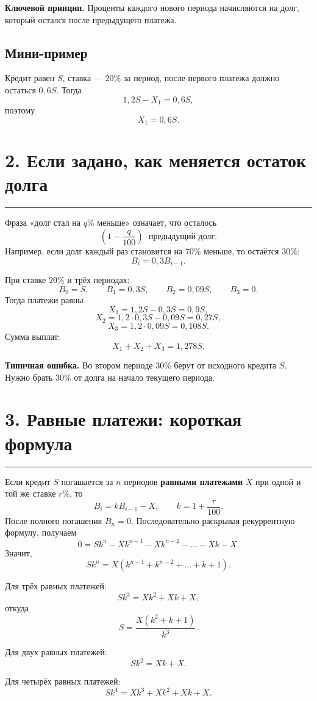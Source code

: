 \documentclass[a4paper,12pt]{article}
\newcommand{\sectionline}{\vspace{-0.4em}\textcolor{linegray}{\rule{\linewidth}{0.5pt}}\vspace{0.35em}}
\newcommand{\key}[1]{\textcolor{darkaccent}{\textbf{#1}}}
\begin{document}
\key{Ключевой принцип.} Проценты каждого нового периода начисляются на долг, который остался после предыдущего платежа.

\subsection*{Мини-пример}
Кредит равен $S$, ставка --- $20\%$ за период, после первого платежа должно остаться $0{,}6S$.
Тогда
\[
1{,}2S-X_1=0{,}6S,
\]
поэтому
\[
\boxed{X_1=0{,}6S.}
\]

\section*{2. Если задано, как меняется остаток долга}
\sectionline

Фраза «долг стал на $q\%$ меньше» означает, что осталось
\[
\left(1-\frac{q}{100}\right)\cdot\text{предыдущий долг}.
\]
Например, если долг каждый раз становится на $70\%$ меньше, то остаётся $30\%$:
\[
B_i=0{,}3B_{i-1}.
\]

При ставке $20\%$ и трёх периодах:
\[
B_0=S,\qquad B_1=0{,}3S,\qquad B_2=0{,}09S,\qquad B_3=0.
\]
Тогда платежи равны
\[
X_1=1{,}2S-0{,}3S=0{,}9S,
\]
\[
X_2=1{,}2\cdot0{,}3S-0{,}09S=0{,}27S,
\]
\[
X_3=1{,}2\cdot0{,}09S=0{,}108S.
\]
Сумма выплат:
\[
\boxed{X_1+X_2+X_3=1{,}278S.}
\]

\key{Типичная ошибка.} Во втором периоде $30\%$ берут от исходного кредита $S$. Нужно брать $30\%$ от долга на начало текущего периода.

\clearpage

\section*{3. Равные платежи: короткая формула}
\sectionline

Если кредит $S$ погашается за $n$ периодов \textbf{равными платежами} $X$ при одной и той же ставке $r\%$, то
\[
B_i=kB_{i-1}-X,\qquad k=1+\frac{r}{100}.
\]
После полного погашения $B_n=0$. Последовательно раскрывая рекуррентную формулу, получаем
\[
0=Sk^n-Xk^{n-1}-Xk^{n-2}-\dots-Xk-X.
\]
Значит,
\[
\boxed{Sk^n=X\left(k^{n-1}+k^{n-2}+\dots+k+1\right).}
\]

Для трёх равных платежей:
\[
\boxed{Sk^3=Xk^2+Xk+X,}
\]
откуда
\[
\boxed{S=\frac{X(k^2+k+1)}{k^3}.}
\]

Для двух равных платежей:
\[
\boxed{Sk^2=Xk+X.}
\]

Для четырёх равных платежей:
\[
\boxed{Sk^4=Xk^3+Xk^2+Xk+X.}
\]
\end{document}
